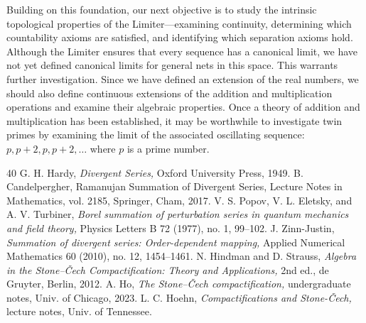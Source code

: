 \documentclass{amsart}
\theoremstyle{definition}
\theoremstyle{plain}
\begin{document}
Building on this foundation, our next objective is to study the intrinsic topological properties of the Limiter—examining continuity, determining which countability axioms are satisfied, and identifying which separation axioms hold. Although the Limiter ensures that every sequence has a canonical limit, we have not yet defined canonical limits for general nets in this space. This warrants further investigation. Since we have defined an extension of the real numbers, we should also define continuous extensions of the addition and multiplication operations and examine their algebraic properties. Once a theory of addition and multiplication has been established, it may be worthwhile to investigate twin primes by examining the limit of the associated oscillating sequence: $p, p+2, p, p+2, \ldots$ where $p$ is a prime number.

\begin{thebibliography}{40}
 G. H. Hardy, \emph{Divergent Series,} Oxford University Press, 1949.
 B. Candelpergher, Ramanujan Summation of Divergent Series, Lecture Notes in Mathematics, vol. 2185, Springer, Cham, 2017.
V. S. Popov, V. L. Eletsky, and A. V. Turbiner, \emph{Borel summation of perturbation series in quantum mechanics and field theory,} Physics Letters B 72 (1977), no. 1, 99–102.
J. Zinn-Justin, \emph{Summation of divergent series: Order-dependent mapping,} Applied Numerical Mathematics 60 (2010), no. 12, 1454–1461.
N. Hindman and D. Strauss, \emph{Algebra in the Stone–\v{C}ech Compactification: Theory and Applications,} 2nd ed., de Gruyter, Berlin, 2012.
A. Ho, \emph{The Stone–\v{C}ech compactification,} undergraduate notes, Univ. of Chicago, 2023.
L. C. Hoehn, \emph{Compactifications and Stone-\v{C}ech,} lecture notes, Univ. of Tennessee.
\end{thebibliography}
\end{document}
